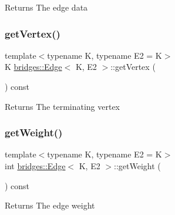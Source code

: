 \begin{DoxyReturn}{Returns}
The edge data 
\end{DoxyReturn}
\mbox{\label{classbridges_1_1_edge_ab02ff346e56eca417ac8caddbbc870f4}} 
\subsubsection{\texorpdfstring{get\+Vertex()}{getVertex()}}
{\footnotesize\ttfamily template$<$typename K, typename E2 = K$>$ \\
K \mbox{\hyperlink{classbridges_1_1_edge}{bridges\+::\+Edge}}$<$ K, E2 $>$\+::get\+Vertex (\begin{DoxyParamCaption}{ }\end{DoxyParamCaption}) const\hspace{0.3cm}{\ttfamily [inline]}}

\begin{DoxyReturn}{Returns}
The terminating vertex 
\end{DoxyReturn}
\mbox{\label{classbridges_1_1_edge_a26c103abb7d17e569a764def3c254076}} 
\subsubsection{\texorpdfstring{get\+Weight()}{getWeight()}}
{\footnotesize\ttfamily template$<$typename K, typename E2 = K$>$ \\
int \mbox{\hyperlink{classbridges_1_1_edge}{bridges\+::\+Edge}}$<$ K, E2 $>$\+::get\+Weight (\begin{DoxyParamCaption}{ }\end{DoxyParamCaption}) const\hspace{0.3cm}{\ttfamily [inline]}}

\begin{DoxyReturn}{Returns}
The edge weight 
\end{DoxyReturn}
\mbox{\label{classbridges_1_1_edge_a0f4b37731a5510b46709b095fa6eefb5}} 
